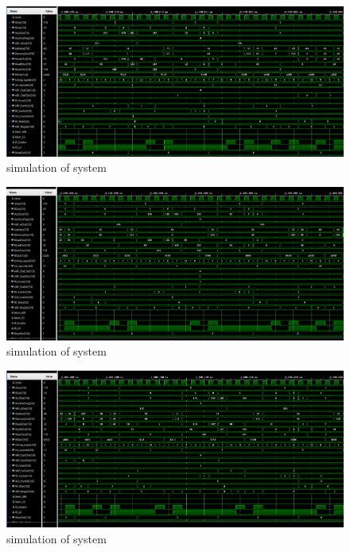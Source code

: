 \documentclass[pdftex,12pt,a4paper]{article}
\begin{document}
\begin{figure}[H]
    \centering
    \includegraphics[width=1\textwidth]{photos/system_result_7.png}	
    \caption{simulation of system}
    \label{implementation}
\end{figure}

\begin{figure}[H]
    \centering
    \includegraphics[width=1\textwidth]{photos/system_result_8.png}	
    \caption{simulation of system}
    \label{implementation}
\end{figure}

\begin{figure}[H]
    \centering
    \includegraphics[width=1\textwidth]{photos/system_result_9.png}	
    \caption{simulation of system}
    \label{implementation}
\end{figure}
\end{document}

